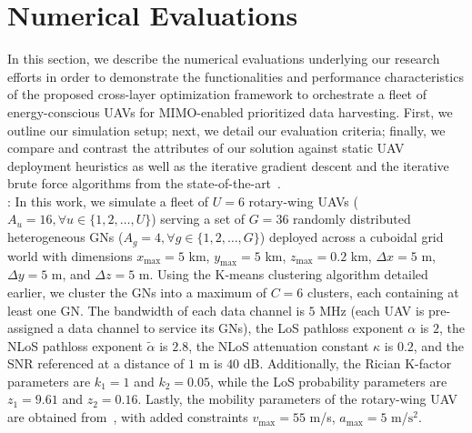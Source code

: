 \documentclass[10pt, twocolumn]{IEEEtran}
\begin{document}
\section{Numerical Evaluations}\label{S4}
In this section, we describe the numerical evaluations underlying our research efforts in order to demonstrate the functionalities and performance characteristics of the proposed cross-layer optimization framework to orchestrate a fleet of energy-conscious UAVs for MIMO-enabled prioritized data harvesting. First, we outline our simulation setup; next, we detail our evaluation criteria; finally, we compare and contrast the attributes of our solution against static UAV deployment heuristics as well as the iterative gradient descent and the iterative brute force algorithms from the state-of-the-art~\cite{CORES_ICASSP}.\\
: In this work, we simulate a fleet of $U{=}6$ rotary-wing UAVs ($A_{u}{=}16,{\forall}u{\in}\{1,2,{\dots},U\}$) serving a set of $G{=}36$ randomly distributed heterogeneous GNs ($A_{g}{=}4,{\forall}g{\in}\{1,2,{\dots},G\}$) deployed across a cuboidal grid world with dimensions $x_{\mathrm{max}}{=}5$ km, $y_{\mathrm{max}}{=}5$ km, $z_{\mathrm{max}}{=}0.2$ km, $\Delta x{=}5$ m, $\Delta y{=}5$ m, and $\Delta z{=}5$ m. Using the K-means clustering algorithm detailed earlier, we cluster the GNs into a maximum of $C{=}6$ clusters, each containing at least one GN. The bandwidth of each data channel is $5$ MHz (each UAV is pre-assigned a data channel to service its GNs), the LoS pathloss exponent $\alpha$ is $2$, the NLoS pathloss exponent $\tilde{\alpha}$ is $2.8$, the NLoS attenuation constant $\kappa$ is $0.2$, and the SNR referenced at a distance of $1$ m is $40$ dB. Additionally, the Rician K-factor parameters are $k_{1}{=}1$ and $k_{2}{=}0.05$, while the LoS probability parameters are $z_{1}{=}9.61$ and $z_{2}{=}0.16$. Lastly, the mobility parameters of the rotary-wing UAV are obtained from~\cite{UAV_Propulsion_1}, with added constraints $v_{\mathrm{max}}{=}55$ m/s, $a_{\mathrm{max}}{=}5$ m/$\text{s}^{2}$.\\
\end{document}
